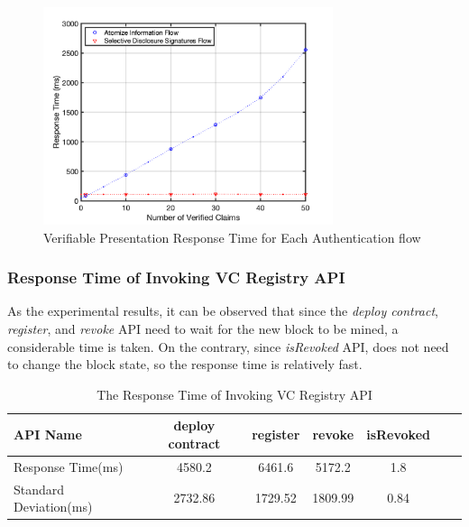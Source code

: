 \documentclass[conference, dvipdfmx]{IEEEtran} %
\begin{document}
\begin{sloppypar}
\begin{figure}[htbp] %
  \begin{center} %
  \includegraphics[width=85mm]{images/new_verification_time.png} %
  \caption{Verifiable Presentation Response Time for Each Authentication flow} %
  \label{fig:new_verification_time} %
  \end{center}
\end{figure}

\subsubsection{Response Time of Invoking VC Registry API}

As the experimental results, it can be observed that since the \textit{deploy contract}, \textit{register}, and \textit{revoke} API need to wait for the new block to be mined, a considerable time is taken. On the contrary, since \textit{isRevoked} API, does not need to change the block state, so the response time is relatively fast.

	\begin{table}[htbp]
		\begin{center}
		\caption{The Response Time of Invoking VC Registry API}
		\label{table:VC_contract_Response_Time}
		\begin{tabular}{p{2cm} cccccc}
		\hline
		API Name & deploy contract & register & revoke & isRevoked \\ \hline\hline
		Response Time(ms) & 4580.2 & 6461.6 & 5172.2 & 1.8 \\ \hline
		Standard Deviation(ms) & 2732.86  & 1729.52  & 1809.99  & 0.84 \\ \hline
		\end{tabular}
		\end{center}
	\end{table}


\end{sloppypar}
\end{document}
